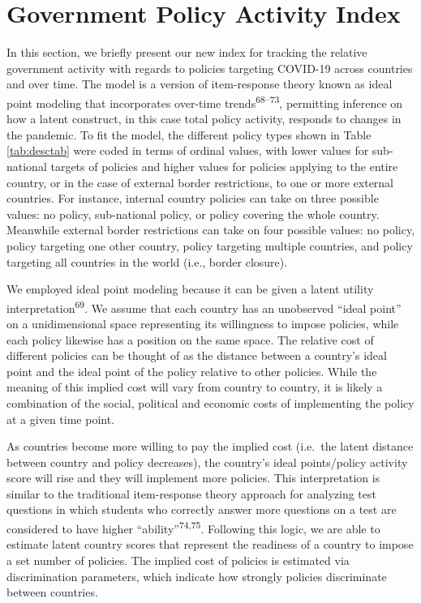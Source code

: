 \documentclass[]{article}
\begin{document}
\hypertarget{government-policy-activity-index}{%
\section*{Government Policy Activity Index}\label{government-policy-activity-index}}

In this section, we briefly present our new index for tracking the relative government activity with regards to policies targeting COVID-19 across countries and over time. The model is a version of item-response theory known as ideal point modeling that incorporates over-time trends\textsuperscript{68--73}, permitting inference on how a latent construct, in this case total policy activity, responds to changes in the pandemic. To fit the model, the different policy types shown in Table \ref{tab:desctab} were coded in terms of ordinal values, with lower values for sub-national targets of policies and higher values for policies applying to the entire country, or in the case of external border restrictions, to one or more external countries. For instance, internal country policies can take on three possible values: no policy, sub-national policy, or policy covering the whole country. Meanwhile external border restrictions can take on four possible values: no policy, policy targeting one other country, policy targeting multiple countries, and policy targeting all countries in the world (i.e., border closure).

We employed ideal point modeling because it can be given a latent utility interpretation\textsuperscript{69}. We assume that each country has an unobserved ``ideal point'' on a unidimensional space representing its willingness to impose policies, while each policy likewise has a position on the same space. The relative cost of different policies can be thought of as the distance between a country's ideal point and the ideal point of the policy relative to other policies. While the meaning of this implied cost will vary from country to country, it is likely a combination of the social, political and economic costs of implementing the policy at a given time point.

As countries become more willing to pay the implied cost (i.e.~the latent distance between country and policy decreases), the country's ideal points/policy activity score will rise and they will implement more policies. This interpretation is similar to the traditional item-response theory approach for analyzing test questions in which students who correctly answer more questions on a test are considered to have higher ``ability''\textsuperscript{74,75}. Following this logic, we are able to estimate latent country scores that represent the readiness of a country to impose a set number of policies. The implied cost of policies is estimated via discrimination parameters, which indicate how strongly policies discriminate between countries.
\end{document}
